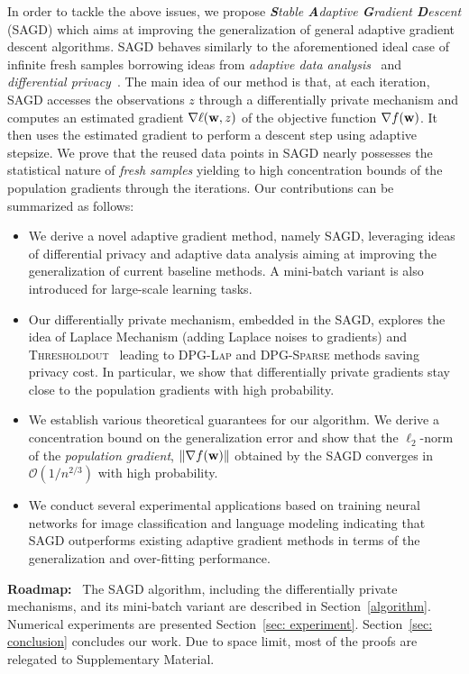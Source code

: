 \documentclass[11pt]{article}
\begin{document}
In order to tackle the above issues, we propose \textit{\textbf{S}table \textbf{A}daptive \textbf{G}radient \textbf{D}escent} (\textsc{SAGD}) which aims at improving the generalization of general adaptive gradient descent algorithms.
\textsc{SAGD} behaves similarly to the aforementioned ideal case of infinite fresh samples borrowing ideas from \emph{adaptive data analysis}~\citep{dwfe15} and \emph{differential privacy}~\citep{dwro2014}. 
The main idea of our method is that, at each iteration, \textsc{SAGD} accesses the observations $z$ through a differentially private mechanism and computes an estimated gradient $\nabla \ell(\mathbf{w},z)$ of the objective function $\nabla f(\mathbf{w})$. 
It then uses the estimated gradient to perform a descent step using adaptive stepsize. 
We prove that the reused data points in \textsc{SAGD} nearly possesses the statistical nature of \emph{fresh samples} yielding to high concentration bounds of the population gradients through the iterations. Our  contributions  can be summarized as follows:
\begin{itemize}
\item We derive a novel adaptive gradient method, namely \textsc{SAGD}, leveraging ideas of differential privacy and adaptive data analysis aiming at improving the generalization of current baseline methods. A mini-batch variant is also introduced for large-scale learning tasks.
\item Our differentially private mechanism, embedded in the \textsc{SAGD}, explores the idea of Laplace Mechanism (adding Laplace noises to gradients) and \textsc{Thresholdout}~\citep{dwro2014} leading to \textsc{DPG-Lap} and \textsc{DPG-Sparse} methods saving privacy cost. 
In particular, we show that differentially private gradients stay close to the population gradients with high probability. 
\item We establish various theoretical guarantees for our algorithm. We derive a concentration bound on the generalization error and show that the $\ell_2$-norm of the \emph{population gradient}, \ie $\|\nabla f(\mathbf{w})\|$ obtained by the \textsc{SAGD} converges in $\mathcal{O}(1/n^{2/3})$ with high probability. 
\item We conduct several experimental applications based on training neural networks for image classification and language modeling indicating that \textsc{SAGD} outperforms existing adaptive gradient methods in terms of the generalization and over-fitting performance.
\end{itemize}
\textbf{Roadmap:} \ 
The \textsc{SAGD} algorithm, including the differentially private mechanisms, and its mini-batch variant are described in Section~\ref{algorithm}. 
Numerical experiments are presented Section~\ref{sec: experiment}. 
Section~\ref{sec: conclusion} concludes our work. 
Due to space limit, most of the proofs are relegated to Supplementary Material.
\end{document}
